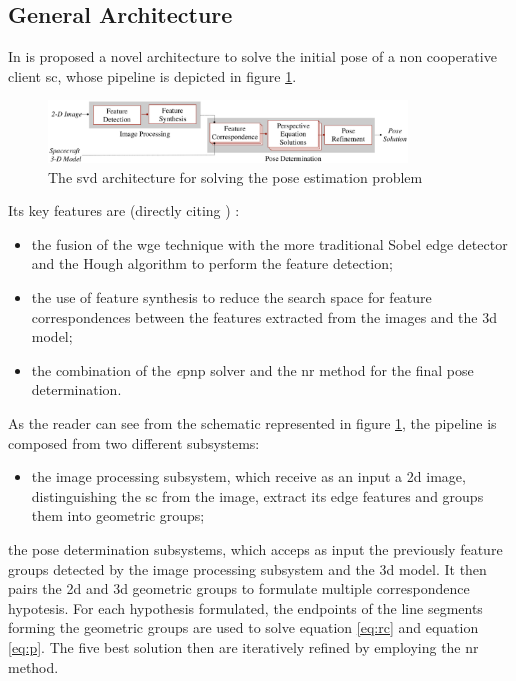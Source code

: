 \subsection{General Architecture}
In \cite{Sharma2018} is proposed a novel architecture to solve the initial pose of a non cooperative client \acrshort{sc}, whose pipeline is depicted in figure \ref{fig:theposeproblem}.

\begin{figure}[htbp]
  \centering
  \includegraphics[width=0.85\textwidth]{gfx/SVDPipeline.eps}
  \caption{The \acrshort{svd} architecture for solving the pose estimation problem \cite{Sharma2018}}
  \label{fig:theposeproblem}
\end{figure}

Its key features are (directly citing \cite{Sharma2018})  :
\begin{itemize}
  \item the fusion of the \acrshort{wge} technique with the more traditional Sobel edge detector and the Hough algorithm to perform the feature detection;
  \item the use of feature synthesis to reduce the search space for feature correspondences between the features extracted from the images and the \acrshort{3d} model;
  \item the combination of the \textit{e}\acrshort{pnp} solver and the \acrfull{nr} method for the final pose determination.
\end{itemize}

As the reader can see from the schematic represented in figure \ref{fig:theposeproblem}, the pipeline is composed from two different subsystems:
\begin{itemize}
  \item the image processing subsystem, which receive as an input a \acrshort{2d} image, distinguishing the \acrshort{sc} from the image, extract its edge features and groups them into geometric groups;
\end{itemize} the pose determination subsystems, which acceps as input the previously feature groups detected by the image processing subsystem and the \acrshort{3d} model. It then pairs the \acrshort{2d} and \acrshort{3d} geometric groups to formulate multiple correspondence hypotesis. For each hypothesis formulated, the endpoints of the line segments forming the geometric groups are used to solve equation \eqref{eq:rc} and equation \eqref{eq:p}. The five best solution then are iteratively refined by employing the \acrshort{nr} method.

